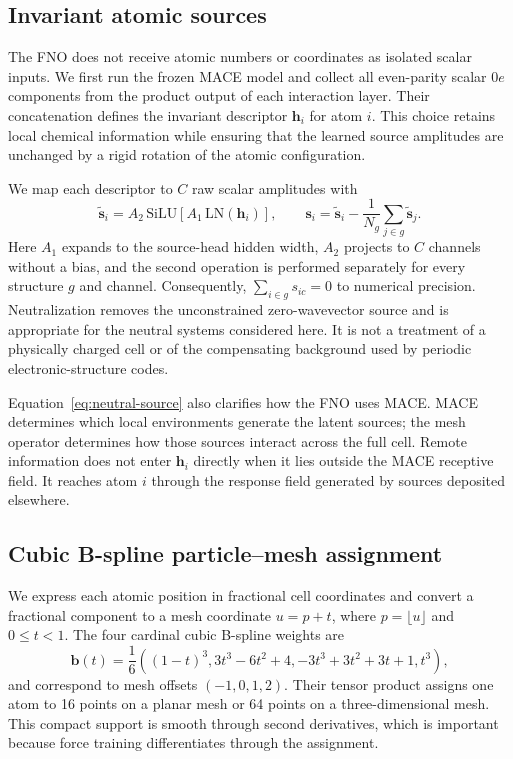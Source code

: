 \documentclass[11pt]{article}
\begin{document}
\subsection{Invariant atomic sources}

The FNO does not receive atomic numbers or coordinates as isolated scalar
inputs. We first run the frozen MACE model and collect all even-parity scalar
\(0e\) components from the product output of each interaction layer. Their
concatenation defines the invariant descriptor \(\mathbf h_i\) for atom
\(i\). This choice retains local chemical information while ensuring that the
learned source amplitudes are unchanged by a rigid rotation of the atomic
configuration.

We map each descriptor to \(C\) raw scalar amplitudes with
\begin{equation}
 \widetilde{\mathbf s}_i
 =A_2\,\mathrm{SiLU}\!\left[A_1\,\mathrm{LN}(\mathbf h_i)\right],\qquad
 \mathbf s_i=\widetilde{\mathbf s}_i
 -\frac{1}{N_g}\sum_{j\in g}\widetilde{\mathbf s}_j .
 \label{eq:neutral-source}
\end{equation}
Here \(A_1\) expands to the source-head hidden width, \(A_2\) projects to
\(C\) channels without a bias, and the second operation is performed
separately for every structure \(g\) and channel. Consequently,
\(\sum_{i\in g}s_{ic}=0\) to numerical precision. Neutralization removes the
unconstrained zero-wavevector source and is appropriate for the neutral
systems considered here. It is not a treatment of a physically charged cell
or of the compensating background used by periodic electronic-structure
codes.

Equation~\eqref{eq:neutral-source} also clarifies how the FNO uses MACE. MACE
determines which local environments generate the latent sources; the mesh
operator determines how those sources interact across the full cell. Remote
information does not enter \(\mathbf h_i\) directly when it lies outside the
MACE receptive field. It reaches atom \(i\) through the response field
generated by sources deposited elsewhere.

\subsection{Cubic B-spline particle--mesh assignment}

We express each atomic position in fractional cell coordinates and convert a
fractional component to a mesh coordinate \(u=p+t\), where \(p=\lfloor
u\rfloor\) and \(0\leq t<1\). The four cardinal cubic B-spline weights are
\begin{equation}
 \mathbf b(t)=\frac{1}{6}\left(
 (1-t)^3,
 3t^3-6t^2+4,
 -3t^3+3t^2+3t+1,
 t^3\right),
 \label{eq:bspline-weights}
\end{equation}
and correspond to mesh offsets \((-1,0,1,2)\). Their tensor product assigns
one atom to 16 points on a planar mesh or 64 points on a three-dimensional
mesh. This compact support is smooth through second derivatives, which is
important because force training differentiates through the assignment.
\end{document}
